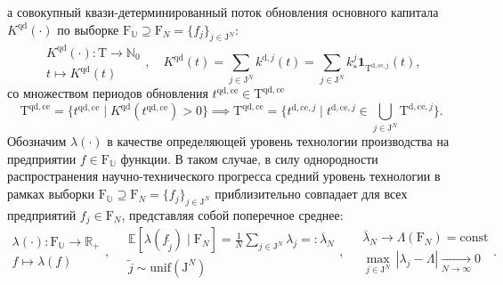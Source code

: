 а совокупный квази-детерминированный поток обновления основного капитала $K^{\mathrm{qd}}(\cdot)$ по выборке $\mathrm{F}_{\mathbb{U}} \supseteq \mathrm F_N = \{f_j\}_{j \in \mathrm{J}^{N}}$:
\begin{equation}\begin{aligned} K^{\mathrm{qd}}(\cdot) : \mathrm{T} \longrightarrow \mathbb{N}_{0} \\ t \longmapsto K^{\mathrm{qd}}(t) \end{aligned}, \quad K^{\mathrm{qd}}(t) = \sum_{j \in \mathrm{J}^{N}} k^{\mathrm{d},j}(t) = \sum_{j \in \mathrm{J}^{N}} k^{j}_{*} \mathbf{1}_{\mathrm{T}^{\mathrm{d,ce},j}}(t),\end{equation}
со множеством периодов обновления $t^{\mathrm{qd,ce}} \in \mathrm{T}^{\mathrm{qd,ce}}$
\begin{equation}\mathrm{T}^{\mathrm{qd,ce}} = \{t^{\mathrm{qd,ce}} \mid K^{\mathrm{qd}}(t^{\mathrm{qd,ce}}) > 0\} \implies \mathrm{T}^{\mathrm{qd,ce}} = \{t^{\mathrm{d,ce},j} \mid t^{\mathrm{d,ce},j} \in \bigcup_{j \in \mathrm{J}^{N}} \mathrm{T}^{\mathrm{d,ce},j}\}.\end{equation}
Обозначим $\lambda(\cdot)$ в качестве определяющей уровень технологии производства на предприятии $f \in \mathrm{F}_{\mathbb{U}}$ функции. В таком случае, в силу однородности распространения научно-технического прогресса средний уровень технологии в рамках выборки $\mathrm{F}_{\mathbb{U}} \supseteq \mathrm F_N = \{f_j\}_{j \in \mathrm{J}^{N}}$ приблизительно совпадает для всех предприятий $f_j \in \mathrm{F}_{N}$, представляя собой поперечное среднее:
\begin{equation}\begin{aligned} \lambda(\cdot) : \mathrm{F}_{\mathbb{U}} \longrightarrow \mathbb{R}_{+} \\ f \longmapsto \lambda(f) \end{aligned}, \quad \begin{aligned} \mathbb{E}[\lambda(f_{\tilde{j}}) \mid \mathrm{F}_{N}] = \frac{1}{N} \sum_{j \in \mathrm{J}^{N}} \lambda_{j} =: \overline{\lambda}_{N} \\ \tilde{j} \sim \mathrm{unif}(\mathrm{J}^{N}) \end{aligned}, \quad \begin{aligned} \overline{\lambda}_{N} \longrightarrow \Lambda(\mathrm{F}_{N}) = \mathrm{const} \\ \max_{j\in \mathrm{J}^{N}}\,|\lambda_j-\Lambda|\xrightarrow[N\to\infty]{}0 \end{aligned}.\end{equation}
